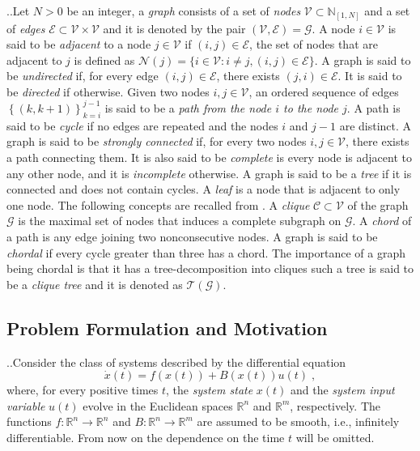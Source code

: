 \documentclass[10pt,twocolumn,twoside]{IEEEtran}
\newcounter{para}
\newcommand\mypara{\par \thesection.\refstepcounter{para}\thepara.\space}
\theoremstyle{plain}
\theoremstyle{definition}
\theoremstyle{remark}
\begin{document}
\mypara Let $N>0$ be an integer, a \emph{graph} consists of a set of \emph{nodes} $\mathscr{V}\subset\mathbb{N}_{[1,N]}$ and a set of \emph{edges} $\mathscr{E}\subset\mathscr{V}\times\mathscr{V}$ and it is denoted by the pair $(\mathscr{V},\mathscr{E})=\mathscr{G}$. A node $i\in\mathscr{V}$ is said to be \emph{adjacent} to a node $j\in\mathscr{V}$ if $(i,j)\in\mathscr{E}$, the set of nodes that are adjacent to $j$ is defined as $\mathscr{N}(j)=\{i\in\mathscr{V}:i\neq j,(i,j)\in\mathscr{E}\}$. A graph is said to be \emph{undirected} if, for every edge $(i,j)\in\mathscr{E}$, there exists $(j,i)\in\mathscr{E}$. It is said to be \emph{directed} if otherwise. Given two nodes $i,j\in\mathscr{V}$, an ordered sequence of edges $\left\{(k,k+1)\right\}_{k=i}^{j-1}$ is said to be a \emph{path from the node $i$ to the node $j$}. A path is said to be \emph{cycle} if no edges are repeated and the nodes $i$ and $j-1$  are distinct. A graph is said to be \emph{strongly connected} if, for every two nodes $i,j\in\mathscr{V}$, there exists a path connecting them. It is also said to be \emph{complete} is every node is adjacent to any other node, and it is \emph{incomplete} otherwise. A graph is said to be a \emph{tree} if it is connected and does not contain cycles. A \emph{leaf} is a node that is adjacent to only one node. The following concepts are recalled from \cite{PakazadHanssonAndersenEtAl2015,VandenbergheAndersen2015,BlairPeyton1993}. A \emph{clique} $\mathscr{C}\subset\mathscr{V}$ of the graph $\mathscr{G}$ is the maximal set of nodes that induces a complete subgraph on $\mathscr{G}$. A \emph{chord} of a path is any edge joining two nonconsecutive nodes. A graph is said to be \emph{chordal} if every cycle greater than three has a chord. The importance of a graph being chordal is that it has a tree-decomposition into cliques  \cite[Proposition~12.3.11]{Diestel2005} such a tree is said to be a \emph{clique tree} and it is denoted as $\mathscr{T}(\mathscr{G})$.


\subsection{Problem Formulation and Motivation}\label{sec:Problem Formulation and Motivation}

\mypara Consider the class of systems described by the differential equation
\begin{equation}\label{eq:general system}
	\dot{x}(t)=f(x(t))+B(x(t))u(t)\;,	
\end{equation}
where, for every positive times $t$, the \emph{system state} $x(t)$ and the \emph{system input variable} $u(t)$ evolve in the Euclidean spaces $\mathbb{R}^n$ and $\mathbb{R}^m$, respectively. The functions $f:\mathbb{R}^n\to\mathbb{R}^n$ and $B:\mathbb{R}^n\to\mathbb{R}^m$ are assumed to be smooth, i.e., infinitely differentiable. From now on the dependence on the time $t$ will be omitted.
\end{document}
